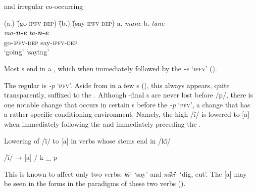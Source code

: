 \ea%
    \label{ex:verbs:1g}
     and irregular   co-occurring \\
\begin{tabbing}
{(a.)} \= {(go-\textsc{ipfv}-\textsc{dep})} \= {(b.)} \=({say-\textsc{ipfv}-\textsc{dep})}\kill
{a.} \> {\textit{mane}} \> {b.} \> {\textit{tane}}\\
{ } \> {\textit{ma-\textbf{n-e}}} \> { } \> {\textit{ta-\textbf{n-e}}}\\
{ } \> {go-\textsc{ipfv}-\textsc{dep}} \> { } \> {say-\textsc{ipfv}-\textsc{dep}}\\
{ } \> {‘going'} \> { } \> {‘saying’}
      \end{tabbing}
\z

Most s end in a , which  when immediately followed by the   \textit{{}-e} ‘\textsc{ipfv}’ ().

  The regular   is \textit{{}-p} ‘\textsc{pfv}’. Aside from in a few s (), this  always appears, quite transparently, suffixed to the . Although -final s are never lost before /p/, there is one notable  change that occurs in certain s before the   \textit{{}-p} ‘\textsc{pfv}’, a change that has a rather specific conditioning environment. Namely, the  high  /ï/ is lowered to [a] when immediately following the    and immediately preceding the    .

\ea%
    \label{ex:verbs:2}

            Lowering of /ï/ to [a] in  verbs whose stems end in /kï/

    /ï/ → [a] / k \_ p
\z

This is known to affect only two verbs: \textit{kï-} ‘say’ and \textit{nïkï-} ‘dig, cut’. The  [a] may be seen in the  forms in the paradigms of these two verbs ().

